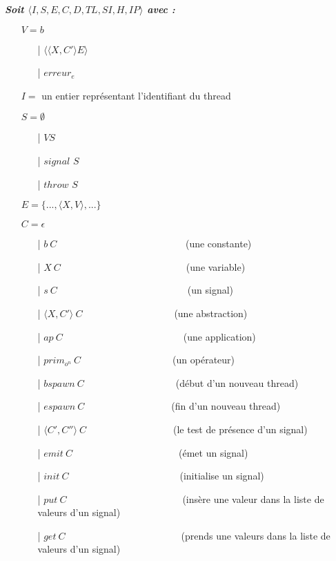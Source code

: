 \documentclass[10pt,a4paper]{report}
\begin{document}
	
	
	\textbf{\textit{Soit $\langle I,S,E,C,D,TL,SI,H,IP\rangle$ avec :}}
	
	\begin{itemize}
		\item[] $V = b$	
		\begin{itemize}
			\item[|] $\langle\langle X,C' \rangle E\rangle$
			\item[|] $erreur_{e}$
		\end{itemize}
		\item[] $I =$ un entier représentant l'identifiant du thread
		\item[] $S =  \emptyset$ 
		\begin{itemize}
			\item[|] $V S$
			\item[|] $signal$ $S$
			\item[|] $throw$ $S$
		\end{itemize}
		\item[] $E = \{...,\langle X,V\rangle,...\}$
		\item[] $C = \epsilon$
		\begin{itemize}
			\item[|] $b~C$~~~~~~~~~~~~~~~~~~~~~~~~~~    (une constante)
			\item[|] $X~C$~~~~~~~~~~~~~~~~~~~~~~~~~~(une variable)
			\item[|] $s~C$~~~~~~~~~~~~~~~~~~~~~~~~~~~(un signal)
			\item[|] $\langle X,C'\rangle~C$~~~~~~~~~~~~~~~~~~~(une abstraction)
			\item[|] $ap~C$~~~~~~~~~~~~~~~~~~~~~~~~~(une application)
			\item[|] $prim_{o^{n}}~C$~~~~~~~~~~~~~~~~~~~(un opérateur)
			\item[|] $bspawn~C$~~~~~~~~~~~~~~~~~~~(début d'un nouveau thread)
			\item[|] $espawn~C$~~~~~~~~~~~~~~~~~~(fin d'un nouveau thread)
			\item[|] $\langle C',C''\rangle~C$~~~~~~~~~~~~~~~~~~(le test de présence d'un signal)
			\item[|] $emit~C$~~~~~~~~~~~~~~~~~~~~~~(émet un signal)
			\item[|] $init~C$~~~~~~~~~~~~~~~~~~~~~~~(initialise un signal)
			\item[|] $put~C$~~~~~~~~~~~~~~~~~~~~~~~~(insère une valeur dans la liste de valeurs d'un signal)
			\item[|] $get~C$~~~~~~~~~~~~~~~~~~~~~~~~(prends une valeurs dans la liste de valeurs d'un signal)

\end{itemize}
\end{itemize}
\end{document}
